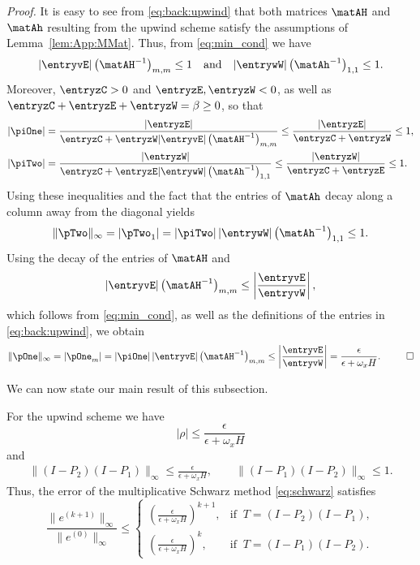{\em Proof.}
It is easy to see from \eqref{eq:back:upwind} that both matrices $\matAH$ and
$\matAh$ resulting from the upwind scheme satisfy the assumptions of
Lemma~\ref{lem:App:MMat}. Thus, from \eqref{eq:min_cond} we have
%
$$|\entryvE| \left(\matAH ^{-1}\right)_{m,m} \leq 1 \quad\mbox{and}\quad
|\entrywW| \left(\matAh ^{-1}\right)_{1,1} \leq 1.$$
%
Moreover, $\entryzC>0$ and $\entryzE,\entryzW<0$, as well as
$\entryzC+\entryzE+\entryzW=\beta \geq 0$, so that
%
\begin{align*}
|\piOne|&=\frac{|\entryzE| }{\entryzC +\entryzW |\entryvE|  \left(\matAH ^{-1}\right)_{m,m}}
\leq\frac{|\entryzE| }{\entryzC + \entryzW}\leq 1,\\
|\piTwo|&=\frac{|\entryzW| }{\entryzC + \entryzE |\entrywW| \left(\matAh ^{-1}\right)_{1,1}}\leq
\frac{|\entryzW| }{\entryzC + \entryzE}\leq 1.
\end{align*}
%
Using these inequalities and the fact that the entries of $\matAh$ decay along
a column away from the diagonal yields
%
$$\|\pTwo\|_\infty=|\pTwo_1|=|\piTwo|\,|\entrywW| \left(\matAh ^{-1}\right)_{1,1}\leq 1.$$
%
Using the decay of the entries of $\matAH$ and
%
$$|\entryvE|  \left(\matAH ^{-1}\right)_{m,m} \leq \left|\frac{\entryvE}{\entryvW}\right|,$$
%
which follows from \eqref{eq:min_cond}, as well as the definitions of the
entries in \eqref{eq:back:upwind}, we obtain
%
$$\|\pOne\|_\infty = |\pOne_m| = |\piOne|\,|\entryvE|
\left(\matAH ^{-1}\right)_{m,m}
\leq \left|\frac{\entryvE}{\entryvW}\right| =
\frac{\epsilon}{\epsilon+\omega_x H%
}. ~~ \qed
$$
%

We can now state our main result of this subsection.

\begin{thm} \label{thm:1D:upwind_conv}
For the upwind scheme we have
%
\begin{equation}\label{eq:1D:bound_upw}
|\rho| \leq \frac{\epsilon}{\epsilon+\omega_x H}
\end{equation}
%
and
%
\begin{align*}
\| (I-P_2)(I-P_1) \|_\infty \leq \frac{\epsilon}{\epsilon+\omega_x H},\qquad
\| (I-P_1)(I-P_2) \|_\infty \leq 1.
\end{align*}
%
Thus, the error of the multiplicative Schwarz method \eqref{eq:schwarz}
satisfies
%
$$\frac{\|e^{(k+1)}\|_\infty}{\|e^{(0)}\|_\infty} \leq
\begin{cases} \left( \frac{\epsilon}{\epsilon+\omega_x H}\right)^{k+1}, &\mbox{if}\;\; T=(I-P_2)(I-P_1), \\
\left( \frac{\epsilon}{\epsilon+\omega_x H}\right)^{k}, &\mbox{if}\;\; T=(I-P_1)(I-P_2). \end{cases}$$
%
\end{thm}

